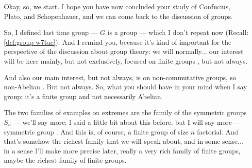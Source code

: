 \begin{speech}[00:00:00 - 00:01:25]
Okay, so, we start. I hope you have now concluded your study of Confucius, Plato, and Schopenhauer, and we can come back to the discussion of groups.

So, I defined last time group --- $G$ is a group  --- which I don't repeat now (Recall: \cref{def:group-w7tue}). And I remind you, because it's kind of important for the perspective of the discussion about group theory: we will normally... our interest will be here mainly, but not exclusively, focused on finite groups , but not always.

And also our main interest, but not always, is on non-commutative groups, so non-Abelian . But not always. So, what you should have in your mind when I say group: it's a finite group and not necessarily Abelian.

The two families of examples on extremes are the family of the symmetric groups $S_n$ --- we'll say more; I said a little bit about this before, but I will say more --- symmetric group . And this is, of course, a finite group of size $n$ factorial. And that's somehow the richest family that we will speak about, and in some sense... in a sense I'll make more precise later, really a very rich family of finite groups, maybe the richest family of finite groups.
\end{speech}

